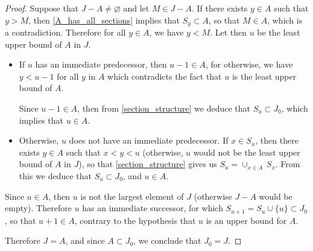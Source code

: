 \documentclass[11pt,a4paper,twoside]{article}
\theoremstyle{definition}
\theoremstyle{plain}
\begin{document}
\begin{proof}
  Suppose that $J - A \neq \varnothing$ and let $M \in J - A$. If there exists $y \in A$ such that $y > M$, then \eqref{A_has_all_sections}
  implies that $S_y \subset A$, so that $M \in A$, which is a contradiction. Therefore for all $y \in A$, we have $y < M$.
  Let then $u$ be the least upper bound of $A$ in $J$.
  \begin{itemize}

  \item If $u$ has an immediate predecessor, then $u - 1 \in A$, for otherwise, we have $y < u - 1$ for all $y$ in $A$ which contradicts
    the fact that $u$ is the least upper bound of $A$.

    Since $u - 1 \in A$, then from \eqref{section_structure} we deduce that $S_u \subset J_0$, which implies that $u \in A$.

  \item Otherwise, $u$ does not have an immediate predecessor. If $x \in S_u$, then there exists $y \in A$ such that $x < y < u$
    (otherwise, $u$ would not be the least upper bound of $A$ in $J$), so that \eqref{section_structure} gives us $S_u = \cup_{x \in A} \, S_x$.
    From this we deduce that $S_u \subset J_0$, and $u \in A$.

  \end{itemize}

  Since $u \in A$, then $u$ is not the largest element of $J$ (otherwise $J - A$ would be empty). Therefore $u$ has an immediate successor,
  for which $S_{u + 1} = S_u \cup \{ u \} \subset J_0$, so that $u + 1 \in A$, contrary to the hypothesis that $u$ is an upper bound for $A$.

  Therefore $J = A$, and since $A \subset J_0$, we conclude that $J_0 = J$.

\end{proof}
\end{document}

